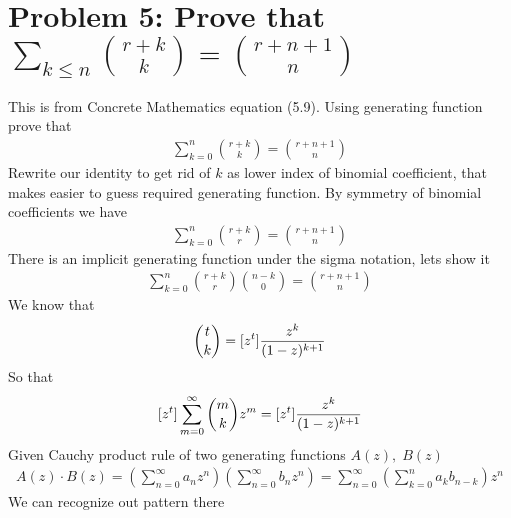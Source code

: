 ﻿\section{Problem 5: Prove that $\sum_{k \leq n} \binom{r+k}{k} = \binom{r+n+1}{n}$}
\label{sec:problem-5:-concrete-mathematics-5.9}
This is from Concrete Mathematics equation (5.9).
Using generating function prove that
\begin{align}
    \sum_{k=0}^{n} \binom{r+k}{k} = \binom{r+n+1}{n}
    \label{eq:identity-to-prove-problem-5}
\end{align}
Rewrite our identity to get rid of $k$ as lower index of binomial coefficient,
that makes easier to guess required generating function.
By symmetry of binomial coefficients we have
\begin{align*}
    \sum_{k=0}^{n} \binom{r+k}{r} = \binom{r+n+1}{n}
\end{align*}
There is an implicit generating function under the sigma notation, lets show it
\begin{align*}
    \sum_{k=0}^{n} \binom{r+k}{r} \binom{n-k}{0} = \binom{r+n+1}{n}
\end{align*}
We know that
\begin{align*}
    \binom{t}{k} = [z^{t}] \frac{z^k}{(1-z)^{k+1}}
\end{align*}
So that
\begin{align*}
    [z^{t}] \sum_{m=0}^{\infty} \binom{m}{k} z^m = [z^{t}] \frac{z^k}{(1-z)^{k+1}}
\end{align*}
Given Cauchy product rule of two generating functions $A(z), \; B(z)$
\begin{align*}
    A(z) \cdot B(z) = \left( \sum_{n=0}^{\infty} a_n z^n \right) \left( \sum_{n=0}^{\infty} b_n z^n \right)
    = \sum_{n=0}^{\infty} \left( \sum_{k=0}^{n} a_k b_{n-k} \right) z^n
\end{align*}
We can recognize out pattern there








\clearpage
